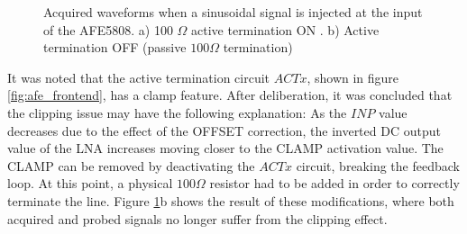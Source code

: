 \begin{figure}[h]
\centering
{}
\caption[]{Acquired waveforms when a sinusoidal signal is injected at the input of the AFE5808. a) 100 $\Omega$ active termination ON . b) Active termination OFF (passive $100 \Omega$ termination) }
\label{fig:fidelity_1}
\end{figure}

It was noted that the active termination circuit $ACTx$, shown in figure \ref{fig:afe_frontend}, has a clamp feature. After deliberation, it was concluded that the clipping issue may have the following explanation: As the $INP$ value decreases due to the effect of the OFFSET correction, the inverted DC output value of the LNA increases moving closer to the CLAMP activation value. The CLAMP can be removed by deactivating the $ACTx$ circuit, breaking the feedback loop. At this point, a physical $100\Omega$ resistor had to be added in order to correctly terminate the line. Figure \ref{fig:fidelity_1}b shows the result of these modifications, where both acquired and probed signals no longer suffer from the clipping effect. 

